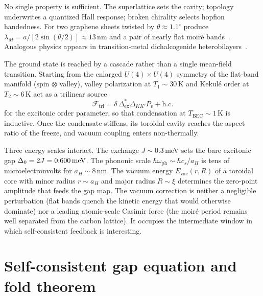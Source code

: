 \documentclass[11pt,letterpaper]{article}
\begin{document}
No single property is sufficient. The superlattice sets the cavity; topology underwrites a quantized Hall response; broken chirality selects hopfion handedness. For \MATBG{} two graphene sheets twisted by $\theta\approx 1.1^\circ$ produce $\lambda_M=a/[2\sin(\theta/2)]\approx 13$\,nm and a pair of nearly flat moir\'e bands~\cite{Cao2018correlated,Cao2018unconventional,Andrei2020,Balents2020}. Analogous physics appears in transition-metal dichalcogenide heterobilayers~\cite{Regan2020,Tang2020}.

The \TEVC{} ground state is reached by a cascade rather than a single mean-field transition. Starting from the enlarged $U(4)\times U(4)$ symmetry of the flat-band manifold (spin $\otimes$ valley), valley polarization at $T_1\sim 30$\,K and Kekul\'e order at $T_2\sim 6$\,K act as a trilinear source
\begin{equation}
\mathcal{F}_{\mathrm{tri}}=\delta\,\Delta_{\mathrm{ex}}^*\Delta_{KK'}P_v+\mathrm{h.c.}
\end{equation}
for the excitonic order parameter, so that condensation at $T_{\mathrm{BEC}}\sim 1$\,K is inductive. Once the condensate stiffens, its toroidal cavity reaches the aspect ratio of the freeze, and vacuum coupling enters non-thermally.

Three energy scales interact. The exchange $J\sim 0.3$\,meV sets the bare excitonic gap $\Delta_0=2J=0.600\,\mathrm{meV}$. The phononic scale $\hbar\omega_{\mathrm{ph}}\sim\hbar c_s/a_H$ is tens of microelectronvolts for $a_H\sim 8$\,nm. The vacuum energy $E_{\mathrm{vac}}(r,R)$ of a toroidal core with minor radius $r\sim a_H$ and major radius $R\sim\xi$ determines the zero-point amplitude that feeds the gap map. The vacuum correction is neither a negligible perturbation (flat bands quench the kinetic energy that would otherwise dominate) nor a leading atomic-scale Casimir force (the moir\'e period remains well separated from the carbon lattice). It occupies the intermediate window in which self-consistent feedback is interesting.

\section{Self-consistent gap equation and fold theorem}
\label{sec:gap}
\end{document}
